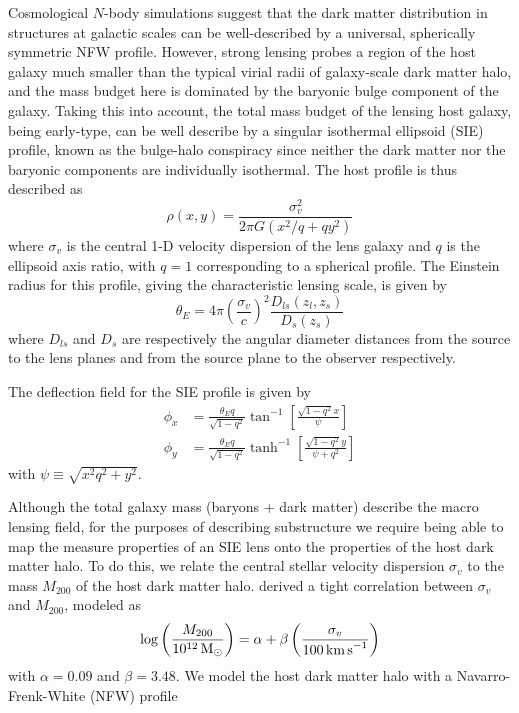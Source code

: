 \documentclass[twocolumn]{aastex62}
\newcommand{\Msun}{\textrm{M}_\odot}
\newcommand{\kmps}{\textrm{km\,s}^{-1}}
\begin{document}
Cosmological $N$-body simulations suggest that the dark matter distribution in structures at galactic scales can be well-described by a universal, spherically symmetric NFW profile. However, strong lensing probes a region of the host galaxy much smaller than the typical virial radii of galaxy-scale dark matter halo, and the mass budget here is dominated by the baryonic bulge component of the galaxy. Taking this into account, the total mass budget of the lensing host galaxy, being early-type, can be well describe by a singular isothermal ellipsoid (SIE) profile, known as the bulge-halo conspiracy since neither the dark matter nor the baryonic components are individually isothermal. The host profile is thus described as
\begin{equation}
\rho(x, y)=\frac{\sigma_{v}^{2}}{2 \pi G\left(x^{2} / q+q y^{2}\right)}
\label{eq:hostprofile}
\end{equation}
where $\sigma_{v}$ is the central 1-D velocity dispersion of the lens galaxy and $q$ is the ellipsoid axis ratio, with $q=1$ corresponding to a spherical profile. The Einstein radius for this profile, giving the characteristic lensing scale, is given by
\begin{equation}
\theta_{{E}}=4 \pi\left(\frac{\sigma_{v}}{c}\right)^{2} \frac{D_{l s}\left(z_{l}, z_{s}\right)}{D_{s}\left(z_{s}\right)}
\label{eq:siethetae}
\end{equation}
where $D_{ls}$ and $D_s$ are respectively the angular diameter distances from the source to the lens planes and from the source plane to the observer respectively. 

The deflection field for the SIE profile is given by~\citep{2001astro.ph..2341K}
\begin{align} 
\phi_{x} &=\frac{\theta_E q}{\sqrt{1-q^{2}}} \tan ^{-1}\left[\frac{\sqrt{1-q^{2}} x}{\psi}\right] \\ 
\phi_{y} &=\frac{\theta_E q}{\sqrt{1-q^{2}}} \tanh ^{-1}\left[\frac{\sqrt{1-q^{2}} y}{\psi+q^{2} }\right] 
\end{align}
with $\psi \equiv \sqrt{x^2 q^2 + y^2}$.

Although the total galaxy mass (baryons + dark matter) describe the macro lensing field, for the purposes of describing substructure we require being able to map the measure properties of an SIE lens onto the properties of the host dark matter halo. To do this, we relate the central stellar velocity dispersion $\sigma_v$ to the mass $M_{200}$ of the host dark matter halo. \citet{2018ApJ...859...96Z} derived a tight correlation between $\sigma_v$ and $M_{200}$, modeled as
\begin{equation}
\log\left(\frac{M_{200}}{10^{12}\,\Msun}\right) = \alpha + \beta\left(\frac{\sigma_v}{100\,\kmps}\right)
\end{equation}
with $\alpha = 0.09$ and $\beta = 3.48$. %
We model the host dark matter halo with a Navarro-Frenk-White (NFW) profile~\citep{1996ApJ...462..563N,1997ApJ...490..493N}
\end{document}
